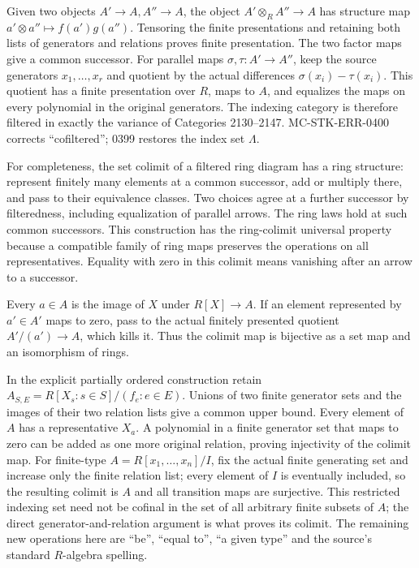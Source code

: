 Given two objects \(A'\to A,A''\to A\), the object \(A'\otimes_R A''\to A\) has structure map \(a'\otimes a''\mapsto f(a')g(a'')\). Tensoring the finite presentations and retaining both lists of generators and relations proves finite presentation. The two factor maps give a common successor. For parallel maps \(\sigma,\tau:A'\to A''\), keep the source generators \(x_1,\ldots,x_r\) and quotient by the actual differences \(\sigma(x_i)-\tau(x_i)\). This quotient has a finite presentation over \(R\), maps to \(A\), and equalizes the maps on every polynomial in the original generators. The indexing category is therefore filtered in exactly the variance of Categories 2130--2147. MC-\AlgebraIdentifierBreak{}STK-\AlgebraIdentifierBreak{}ERR-\AlgebraIdentifierBreak{}0400 corrects ``cofiltered''; 0399 restores the index set \(\Lambda\).

For completeness, the set colimit of a filtered ring diagram has a ring structure: represent finitely many elements at a common successor, add or multiply there, and pass to their equivalence classes. Two choices agree at a further successor by filteredness, including equalization of parallel arrows. The ring laws hold at such common successors. This construction has the ring-colimit universal property because a compatible family of ring maps preserves the operations on all representatives. Equality with zero in this colimit means vanishing after an arrow to a successor.

Every \(a\in A\) is the image of \(X\) under \(R[X]\to A\). If an element represented by \(a'\in A'\) maps to zero, pass to the actual finitely presented quotient \(A'/(a')\to A\), which kills it. Thus the colimit map is bijective as a set map and an isomorphism of rings.

In the explicit partially ordered construction retain \(A_{S,E}=R[X_s:s\in S]/(f_e:e\in E)\). Unions of two finite generator sets and the images of their two relation lists give a common upper bound. Every element of \(A\) has a representative \(X_a\). A polynomial in a finite generator set that maps to zero can be added as one more original relation, proving injectivity of the colimit map. For finite-type \(A=R[x_1,\ldots,x_n]/I\), fix the actual finite generating set and increase only the finite relation list; every element of \(I\) is eventually included, so the resulting colimit is \(A\) and all transition maps are surjective. This restricted indexing set need not be cofinal in the set of all arbitrary finite subsets of \(A\); the direct generator-and-relation argument is what proves its colimit. The remaining new operations here are ``be'', ``equal to'', ``a given type'' and the source's standard \(R\)-algebra spelling.


